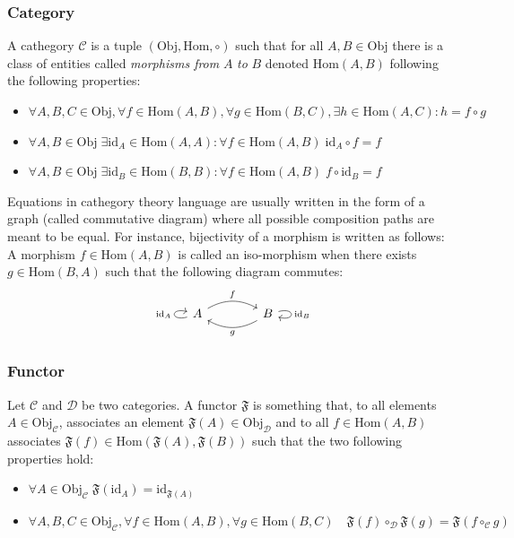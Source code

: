 \documentclass[a4paper,11pt]{article}
\numberwithin{equation}{section}
\theoremstyle{definition}
\begin{document}
    \subsubsection{Category}
    A cathegory $\mathcal{C}$ is a tuple $(\mathrm{Obj},\mathrm{Hom},\circ)$ such that for all $A,B \in \mathrm{Obj}$ there is a class of entities called \emph{morphisms from} $A$ \emph{to} $B$ denoted $\mathrm{Hom}(A,B)$ following the following properties:
    \begin{itemize}
        \item $\forall A, B, C \in \mathrm{Obj}, \forall f\in \mathrm{Hom}(A,B), \forall g\in \mathrm{Hom}(B,C), \exists h \in \mathrm{Hom} (A,C) : h=f\circ g$
        \item $\forall A,B \in \mathrm{Obj} \; \exists \mathrm{id}_A \in \mathrm{Hom}(A,A): \forall f \in \mathrm{Hom}(A,B) \; \mathrm{id}_A\circ f=f$
        \item $\forall A,B \in \mathrm{Obj} \; \exists \mathrm{id}_B \in \mathrm{Hom}(B,B): \forall f \in \mathrm{Hom}(A,B) \; f\circ \mathrm{id}_B=f$
    \end{itemize}
    Equations in cathegory theory language are usually written in the form of a graph (called commutative diagram) where all possible composition paths are meant to be equal. For instance, bijectivity of a morphism is written as follows:\\
    A morphism $f \in \mathrm{Hom}(A,B)$ is called an iso-morphism when there exists $g \in \mathrm{Hom}(B,A)$ such that the following diagram commutes:
    $$\begin{tikzcd}[column sep=4em,row sep=4em,/tikz/column 2/.style={column sep=2em}]
\arrow[loop left]{l}{\mathrm{id}_A} A \arrow[r,bend left,"f"]
    & B \arrow[l,bend left,"g"] \arrow[loop right]{r}{\mathrm{id}_B}
\end{tikzcd}$$

\subsubsection{Functor}
    Let $\mathcal{C}$ and $\mathcal{D}$ be two categories. A functor $\mathfrak{F}$ is something that, to all elements $A\in\mathrm{Obj}_\mathcal{C}$, associates an element $\mathfrak{F}(A)\in\mathrm{Obj}_\mathcal{D}$ and to all $f \in \mathrm{Hom}(A,B)$ associates $\mathfrak{F}(f)\in\mathrm{Hom}(\mathfrak{F}(A),\mathfrak{F}(B))$ such that the two following properties hold:
    \begin{itemize}
        \item $\forall A \in \mathrm{Obj}_\mathcal{C}\; \mathfrak{F}(\mathrm{id}_A)=\mathrm{id}_{\mathfrak{F}(A)}$
        \item $\forall A,B,C \in \mathrm{Obj}_\mathcal{C}, \forall f \in \mathrm{Hom}(A,B), \forall g \in \mathrm{Hom}(B,C)\quad \mathfrak{F}(f)\circ_\mathcal{D}\mathfrak{F}(g)=\mathfrak{F}(f\circ_\mathcal{C}g)$
    \end{itemize}
\end{document}
